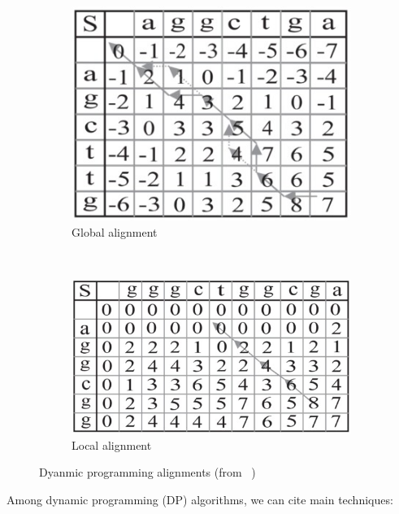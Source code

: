 \begin{figure}[ht!]
	\centering
	\begin{subfigure}[t]{0.5\textwidth}
		\centering
		\includegraphics[height=0.5\textwidth]{global_align}
		\caption{Global alignment}
		\label{fig:global_align}
	\end{subfigure}%
	~ 
	\begin{subfigure}[t]{0.5\textwidth}
		\centering
		\includegraphics[height=0.5\textwidth]{local_align}
		\caption{Local alignment}
		\label{fig:local_align}
	\end{subfigure}
	\caption{Dyanmic programming alignments (from ~\cite{Aluru:2005:HCM:1121650}) }
	\label{fig:dpmatrix}
\end{figure}



Among dynamic programming (DP) algorithms, we can cite main techniques:

